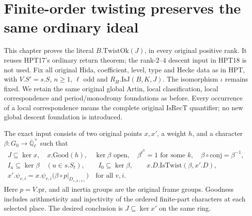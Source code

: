 \documentclass[11pt,a4paper]{article}
\numberwithin{equation}{section}
\theoremstyle{remark}\newtheorem{remark}[theorem]{Remark}
\begin{document}
\section{Finite-order twisting preserves the same ordinary ideal}
\label{sec:hida-twisting-v45}

This chapter proves the literal $B.\mathrm{TwistOk}(J)$, in every
original positive rank.  It reuses HPT17's ordinary return theorem;
the rank-$2$--$4$ descent input in HPT18 is not used.  Fix all
original Hida, coefficient, level, type and Hecke data as in HPT,
with $V.S'=s.S$, $n\geq1$, $\ell$ odd and
$R_H.\mathrm{IsJ}(B,K,J)$.  The isomorphism $\iota$ remains fixed.
We retain the same original global Artin, local classification,
local correspondence and period/monodromy foundations as before.
Every occurrence of a local correspondence means the complete
original $\mathrm{IsRecT}$ quantifier; no new global descent
foundation is introduced.

The exact input consists of two original points $x,x'$, a weight
$h$, and a character $\beta:G_0\to\overline{\mathbb Q}_\ell^\times$
such that
\[
 \begin{gathered}
 J\subseteq\ker x,\quad x.\mathrm{Good}(h),\quad
 \ker\beta\text{ open},\quad \beta^{\ell^k}=1\text{ for some }k,\quad
 \beta\circ\mathrm{conj}=\beta^{-1},\\
 I_u\subseteq\ker\beta\quad(u\in s.S_t),\qquad
 I_0\subseteq\ker\beta,\qquad
 x.D.\mathrm{IsTwist}(\beta,x'.D),\\
 x'.\psi_{v,i}=x.\psi_{v,i}
                 \bigl(\beta\circ p|_{D_{s.A(v)}}\bigr)
                                        \quad\text{for all }v,i.
 \end{gathered}                                                  \tag{HTS.1}
\]
Here $p=V.\mathrm{pr}$, and all inertia groups are the original
frame groups.  Goodness includes arithmeticity and injectivity
of the ordered finite-part characters at each selected place.
The desired conclusion is $J\subseteq\ker x'$ on the same ring.

\end{document}
